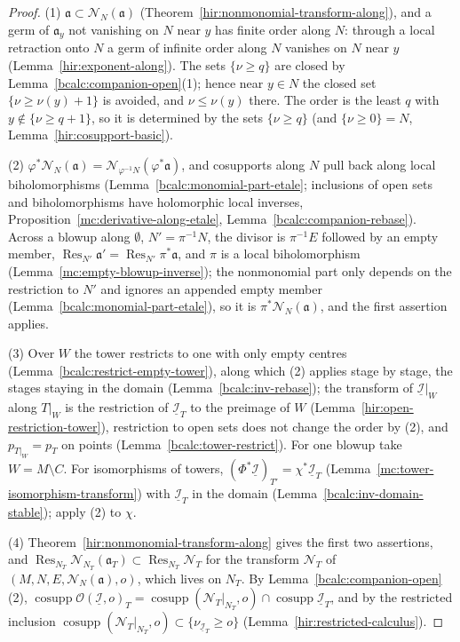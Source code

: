 \begin{proof}
\mixedleanok
(1) \(\mathfrak a\subset\mathcal N_N(\mathfrak a)\) (Theorem~\ref{hir:nonmonomial-transform-along}), and a germ of \(\mathfrak a_y\) not vanishing on \(N\) near \(y\) has finite
order along \(N\): through a local retraction onto \(N\) a germ of infinite order along \(N\) vanishes on \(N\) near \(y\) (Lemma~\ref{hir:exponent-along}). The sets
\(\{\nu\ge q\}\) are closed by Lemma~\ref{bcalc:companion-open}(1); hence near \(y\in N\) the closed set \(\{\nu\ge\nu(y)+1\}\) is avoided, and \(\nu\le\nu(y)\)
there. The order is the least \(q\) with \(y\notin\{\nu\ge q+1\}\), so it is determined by the sets \(\{\nu\ge q\}\) (and \(\{\nu\ge0\}=N\),
Lemma~\ref{hir:cosupport-basic}).

(2) \(\varphi^*\mathcal N_N(\mathfrak a)=\mathcal N_{\varphi^{-1}N}(\varphi^*\mathfrak a)\), and cosupports along \(N\) pull back along local biholomorphisms
(Lemma~\ref{bcalc:monomial-part-etale}; inclusions of open sets and biholomorphisms have holomorphic local inverses, Proposition~\ref{mc:derivative-along-etale},
Lemma~\ref{bcalc:companion-rebase}). Across a blowup along \(\emptyset\), \(N'=\pi^{-1}N\), the divisor is \(\pi^{-1}E\) followed by an empty member,
\(\operatorname{Res}_{N'}\mathfrak a'=\operatorname{Res}_{N'}\pi^*\mathfrak a\), and \(\pi\) is a local biholomorphism (Lemma~\ref{mc:empty-blowup-inverse}); the nonmonomial
part only depends on the restriction to \(N'\) and ignores an appended empty member (Lemma~\ref{bcalc:monomial-part-etale}), so it is
\(\pi^*\mathcal N_N(\mathfrak a)\), and the first assertion applies.

(3) Over \(W\) the tower restricts to one with only empty centres (Lemma~\ref{bcalc:restrict-empty-tower}), along which (2) applies stage by stage, the stages
staying in the domain (Lemma~\ref{bcalc:inv-rebase}); the transform of \(\underline{\mathcal I}|_W\) along \(T|_W\) is the restriction of \(\underline{\mathcal I}_T\) to the
preimage of \(W\) (Lemma~\ref{hir:open-restriction-tower}), restriction to open sets does not change the order by (2), and \(p_{T|_W}=p_T\) on points
(Lemma~\ref{bcalc:tower-restrict}). For one blowup take \(W=M\setminus C\). For isomorphisms of towers,
\((\Phi^*\underline{\mathcal I})_{T'}=\chi^*\underline{\mathcal I}_T\) (Lemma~\ref{mc:tower-isomorphism-transform}) with \(\underline{\mathcal I}_T\) in the domain
(Lemma~\ref{bcalc:inv-domain-stable}); apply (2) to \(\chi\).

(4) Theorem~\ref{hir:nonmonomial-transform-along} gives the first two assertions, and \(\operatorname{Res}_{N_T}\mathcal N_{N_T}(\mathfrak a_T)\subset\operatorname{Res}_{N_T}\mathcal N_T\)
for the transform \(\mathcal N_T\) of \((M,N,E,\mathcal N_N(\mathfrak a),o)\), which lives on \(N_T\). By Lemma~\ref{bcalc:companion-open}(2),
\(\operatorname{cosupp}\mathcal O(\underline{\mathcal I},o)_T=\operatorname{cosupp}(\mathcal N_T|_{N_T},o)\cap\operatorname{cosupp}\underline{\mathcal I}_T\), and by the restricted
inclusion \(\operatorname{cosupp}(\mathcal N_T|_{N_T},o)\subset\{\nu_{\underline{\mathcal I}_T}\ge o\}\) (Lemma~\ref{hir:restricted-calculus}).


\end{proof}
